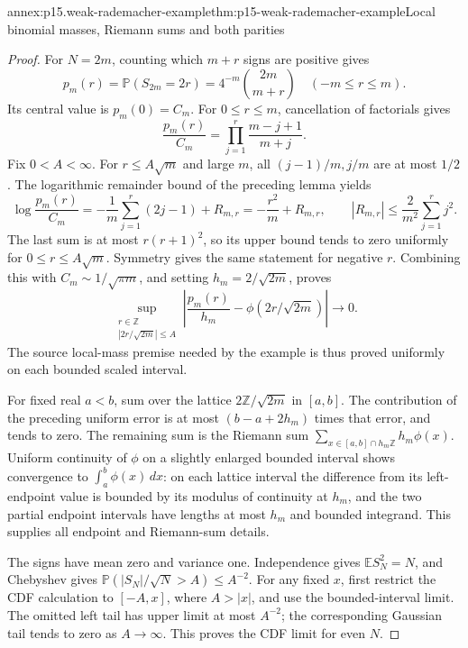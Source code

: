 \begin{annexitem}{annex:p15.weak-rademacher-example}{thm:p15-weak-rademacher-example}{Local binomial masses, Riemann sums and both parities}
\begin{proof}
For \(N=2m\), counting which \(m+r\) signs are positive gives
\[
 p_m(r)=\mathbb P(S_{2m}=2r)
       =4^{-m}\binom{2m}{m+r}\quad(-m\leq r\leq m).
\]
Its central value is \(p_m(0)=C_m\).
For \(0\leq r\leq m\), cancellation of factorials gives
\[
 \frac{p_m(r)}{C_m}
   =\prod_{j=1}^r\frac{m-j+1}{m+j}.
\]
Fix \(0<A<\infty\). For \(r\leq A\sqrt m\) and large \(m\),
all \((j-1)/m,j/m\) are at most \(1/2\).
The logarithmic remainder bound of the preceding lemma yields
\[
 \log\frac{p_m(r)}{C_m}
 =-\frac1m\sum_{j=1}^r(2j-1)+R_{m,r}
 =-\frac{r^2}{m}+R_{m,r},\qquad
 |R_{m,r}|\leq\frac2{m^2}\sum_{j=1}^rj^2.
\]
The last sum is at most \(r(r+1)^2\), so its upper bound
tends to zero uniformly for \(0\leq r\leq A\sqrt m\).
Symmetry gives the same statement for negative \(r\).
Combining this with \(C_m\sim1/\sqrt{\pi m}\), and setting
\(h_m=2/\sqrt{2m}\), proves
\[
 \sup_{\substack{r\in\mathbb Z\\ |2r/\sqrt{2m}|\leq A}}
 \left|\frac{p_m(r)}{h_m}
             -\phi(2r/\sqrt{2m})\right|\longrightarrow0.
\]
The source local-mass premise needed by the example is thus
proved uniformly on each bounded scaled interval.

For fixed real \(a<b\), sum over the lattice
\(2\mathbb Z/\sqrt{2m}\) in \([a,b]\).
The contribution of the preceding uniform error is at most
\((b-a+2h_m)\) times that error, and tends to zero.
The remaining sum is the Riemann sum
\(\sum_{x\in[a,b]\cap h_m\mathbb Z}h_m\phi(x)\).
Uniform continuity of \(\phi\) on a slightly enlarged bounded
interval shows convergence to \(\int_a^b\phi(x)\,dx\):
on each lattice interval the difference from its left-endpoint
value is bounded by its modulus of continuity at \(h_m\),
and the two partial endpoint intervals have lengths at most
\(h_m\) and bounded integrand. This supplies all endpoint
and Riemann-sum details.

The signs have mean zero and variance one. Independence gives
\(\mathbb E S_N^2=N\), and Chebyshev gives
\(\mathbb P(|S_N|/\sqrt N>A)\leq A^{-2}\).
For any fixed \(x\), first restrict the CDF calculation to
\([-A,x]\), where \(A>|x|\), and use the bounded-interval
limit. The omitted left tail has upper limit at most \(A^{-2}\);
the corresponding Gaussian tail tends to zero as \(A\to\infty\).
This proves the CDF limit for even \(N\).


\end{proof}
\end{annexitem}
